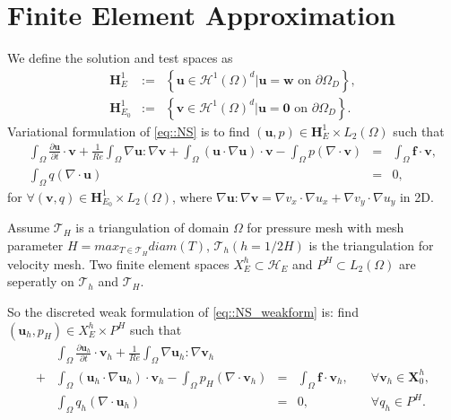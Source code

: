 \documentclass[mathpazo]{aamm}
\begin{document}
\section{Finite Element Approximation}
    \label{sec4} We define the solution and test spaces as
    \begin{eqnarray}
      \mathbf{H}_E^1 & := & \left\{ \mathbf{u} \in \mathcal{H}^1(\Omega)^d \big|
        \mathbf{u} = \mathbf{w} \mbox{ on } \partial \Omega_D \right\},\\
      \mathbf{H}_{E_0}^1 & := & \left\{ \mathbf{v} \in \mathcal{H}^1(\Omega)^d \big|
        \mathbf{u} = \mathbf{0} \mbox{ on } \partial \Omega_D \right\}.
    \end{eqnarray}
    Variational formulation of \eqref{eq::NS} is to find  $(\mathbf{u}, p) \in
   \mathbf{H}_E^1 \times L_2(\Omega)$ such that
   \begin{eqnarray}
     \int_{\Omega}\frac{\partial \mathbf{u}}{\partial t} \cdot \mathbf{v} + 
     \frac{1}{Re} \int_\Omega \nabla \mathbf{u} : \nabla \mathbf{v} + \int_\Omega \left(
       \mathbf{u} \cdot \nabla \mathbf{u} \right) \cdot \mathbf{v} - \int_{\Omega} p
     \left( \nabla \cdot \mathbf{v} \right) & =  &\int_\Omega \mathbf{f} \cdot
     \mathbf{v}, \\
     \int_\Omega q \left( \nabla \cdot \mathbf{u} \right) & = & 0,
     \label{eq::NS_weakform}
   \end{eqnarray}
   for $\forall (\mathbf{v}, q) \in \mathbf{H}_{E_0}^1 \times
   L_2(\Omega)$,  where $\nabla \mathbf{u} : \nabla \mathbf{v} = \nabla v_x \cdot \nabla u_x + \nabla
   v_y \cdot \nabla u_y$ in 2D.

   Assume $\mathcal{T}_H$ is a triangulation of domain $\Omega$ for
   pressure mesh with mesh parameter $H = max_{T \in \mathcal{T}_H} diam(T)$,
   $\mathcal{T}_{h}(h = 1/2H)$ is the triangulation for velocity mesh.
   Two finite element spaces $X_E^h \subset \mathcal{H}_E$ and $P^H
   \subset L_2(\Omega)$ are seperatly on $\mathcal{T}_{h}$
   and $\mathcal{T}_H$.
      
   So the discreted weak formulation of \eqref{eq::NS_weakform} is: find
   $(\mathbf{u}_h, p_H) \in X_E^h \times P^H$ such that
   \begin{equation}
     \begin{aligned}
       &\int_{\Omega}\frac{\partial \mathbf{u}_h}{\partial t} \cdot \mathbf{v}_h
       + \frac{1}{Re} \int_\Omega \nabla \mathbf{u}_h : \nabla \mathbf{v}_h  \\
       + & \int_\Omega \left( \mathbf{u}_h \cdot \nabla \mathbf{u}_h \right)
       \cdot \mathbf{v}_h - \int_\Omega p_H \left( \nabla \cdot \mathbf{v}_h
       \right) & = &\int_\Omega \mathbf{f} \cdot \mathbf{v}_h, &\quad
       \forall \mathbf{v}_h \in \mathbf{X}_0^h,  \\
       & \int_\Omega q_h \left( \nabla \cdot \mathbf{u}_h \right) & = &0,&
       \quad \forall q_h \in P^H.
       \label{eq::discreted_weak}
     \end{aligned}
   \end{equation}
\end{document}
